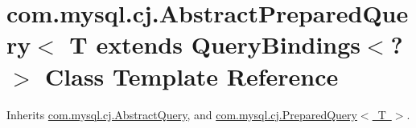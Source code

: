 \hypertarget{classcom_1_1mysql_1_1cj_1_1_abstract_prepared_query}{}\section{com.\+mysql.\+cj.\+Abstract\+Prepared\+Query$<$ T extends Query\+Bindings$<$?$>$ Class Template Reference}
\label{classcom_1_1mysql_1_1cj_1_1_abstract_prepared_query}


Inherits \mbox{\hyperlink{classcom_1_1mysql_1_1cj_1_1_abstract_query}{com.\+mysql.\+cj.\+Abstract\+Query}}, and \mbox{\hyperlink{interfacecom_1_1mysql_1_1cj_1_1_prepared_query}{com.\+mysql.\+cj.\+Prepared\+Query$<$ T $>$}}.

